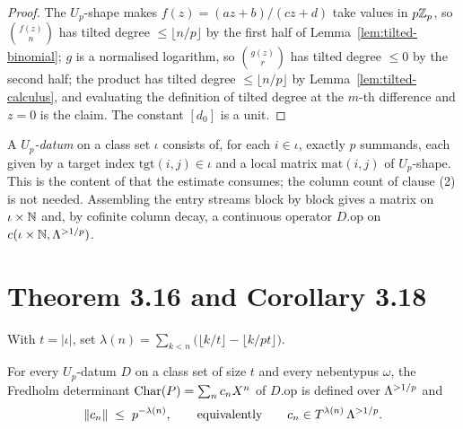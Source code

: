 \begin{proof}
  \leanok
  The $U_p$-shape makes $f(z) = (az+b)/(cz+d)$ take values in $p\mathbb{Z}_p$, so
  $\binom{f(z)}{n}$ has tilted degree $\leq\lfloor n/p\rfloor$ by the first half of
  Lemma~\ref{lem:tilted-binomial}; $g$ is a normalised logarithm, so $\binom{g(z)}{r}$ has tilted
  degree $\leq 0$ by the second half; the product has tilted degree
  $\leq \lfloor n/p\rfloor$ by Lemma~\ref{lem:tilted-calculus}, and evaluating the definition of
  tilted degree at the $m$-th difference and $z=0$ is the claim.  The constant $[d_0]$ is a unit.
\end{proof}

\begin{definition}
  \label{def:updatum}
  \leanok
  A \emph{$U_p$-datum} on a class set $\iota$ consists of, for each $i\in\iota$, exactly $p$
  summands, each given by a target index $\mathrm{tgt}(i,j)\in\iota$ and a local matrix
  $\mathrm{mat}(i,j)$ of $U_p$-shape.  This is the content of \cite[Proposition 3.1]{LWX} that
  the estimate consumes; the column count of clause (2) is not needed.  Assembling the entry
  streams block by block gives a matrix on $\iota\times\mathbb{N}$ and, by cofinite column decay, a
  continuous operator $D.\mathrm{op}$ on $c(\iota\times\mathbb{N}, \Lambda^{>1/p})$.
\end{definition}

\section{Theorem 3.16 and Corollary 3.18}

\begin{definition}
  \label{def:lwxlambda}
  \leanok
  With $t = \lvert\iota\rvert$, set
  $\lambda(n) = \sum_{k<n}\bigl(\lfloor k/t\rfloor - \lfloor k/pt\rfloor\bigr)$.
\end{definition}

\begin{theorem}
  \label{thm:lwx316}
  \leanok
  For every $U_p$-datum $D$ on a class set of size $t$ and every nebentypus $\omega$, the
  Fredholm determinant $\operatorname{Char}(P) = \sum_n c_n X^n$ of $D.\mathrm{op}$ is defined over $\Lambda^{>1/p}$
  and
  \[
    \lVert c_n\rVert \;\leq\; p^{-\lambda(n)},
    \qquad\text{equivalently}\qquad
    c_n \in T^{\lambda(n)}\,\Lambda^{>1/p} .
  \]
\end{theorem}

